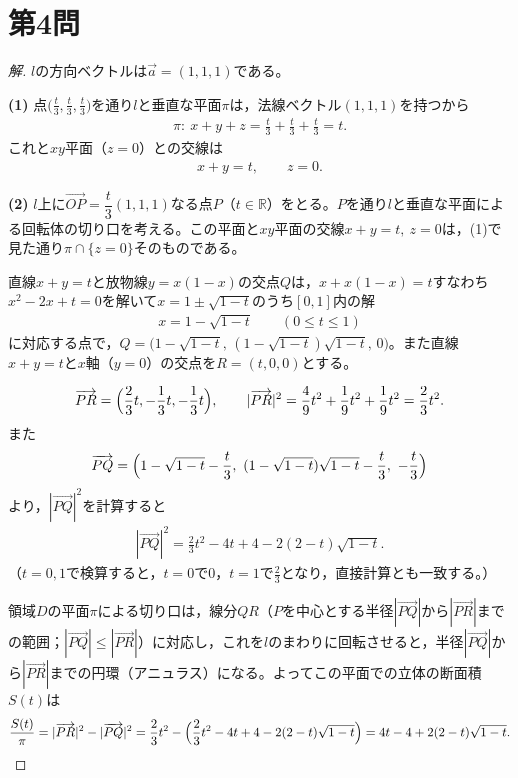 \documentclass[../main.tex]{subfiles}
\begin{document}
\newpage

\section*{第4問}

\begin{proof}[解]
  $l$の方向ベクトルは$\vec a=(1,1,1)$である。

  \textbf{(1)} 点$\bigl(\frac t3,\frac t3,\frac t3\bigr)$を通り$l$と垂直な平面$\pi$は，法線ベクトル$(1,1,1)$を持つから
  \begin{align*}
    \pi:\ x+y+z=\frac t3+\frac t3+\frac t3=t.
  \end{align*}
  これと$xy$平面（$z=0$）との交線は
  \begin{align*}
    x+y=t,\qquad z=0.
  \end{align*}

  \textbf{(2)} $l$上に$\overrightarrow{OP}=\dfrac t3(1,1,1)$なる点$P$（$t\in\mathbb R$）をとる。$P$を通り$l$と垂直な平面による回転体の切り口を考える。この平面と$xy$平面の交線$x+y=t,\ z=0$は，(1)で見た通り$\pi\cap\{z=0\}$そのものである。

  直線$x+y=t$と放物線$y=x(1-x)$の交点$Q$は，$x+x(1-x)=t$すなわち$x^2-2x+t=0$を解いて$x=1\pm\sqrt{1-t}$のうち$[0,1]$内の解
  \begin{align*}
    x=1-\sqrt{1-t}\qquad(0\le t\le1)
  \end{align*}
  に対応する点で，$Q=\bigl(1-\sqrt{1-t},\,(1-\sqrt{1-t})\sqrt{1-t},\,0\bigr)$。また直線$x+y=t$と$x$軸（$y=0$）の交点を$R=(t,0,0)$とする。

  \begin{align*}
    \overrightarrow{PR}=\Bigl(\frac23t,-\frac13t,-\frac13t\Bigr),\qquad|\overrightarrow{PR}|^2=\frac{4}9t^2+\frac19t^2+\frac19t^2=\frac23t^2.
  \end{align*}
  また
  \begin{align*}
    \overrightarrow{PQ}=\Bigl(1-\sqrt{1-t}-\frac t3,\ (1-\sqrt{1-t})\sqrt{1-t}-\frac t3,\ -\frac t3\Bigr)
  \end{align*}
  より，$|\overrightarrow{PQ}|^2$を計算すると
  \begin{align*}
    |\overrightarrow{PQ}|^2=\frac23t^2-4t+4-2(2-t)\sqrt{1-t}.
  \end{align*}
  （$t=0,1$で検算すると，$t=0$で$0$，$t=1$で$\frac23$となり，直接計算とも一致する。）

  領域$D$の平面$\pi$による切り口は，線分$QR$（$P$を中心とする半径$|\overrightarrow{PQ}|$から$|\overrightarrow{PR}|$までの範囲；$|\overrightarrow{PQ}|\le|\overrightarrow{PR}|$）に対応し，これを$l$のまわりに回転させると，半径$|\overrightarrow{PQ}|$から$|\overrightarrow{PR}|$までの円環（アニュラス）になる。よってこの平面での立体の断面積$S(t)$は
  \begin{align*}
    \frac{S(t)}\pi=|\overrightarrow{PR}|^2-|\overrightarrow{PQ}|^2=\frac23t^2-\Bigl(\frac23t^2-4t+4-2(2-t)\sqrt{1-t}\Bigr)=4t-4+2(2-t)\sqrt{1-t}.
  \end{align*}


\end{proof}
\end{document}
